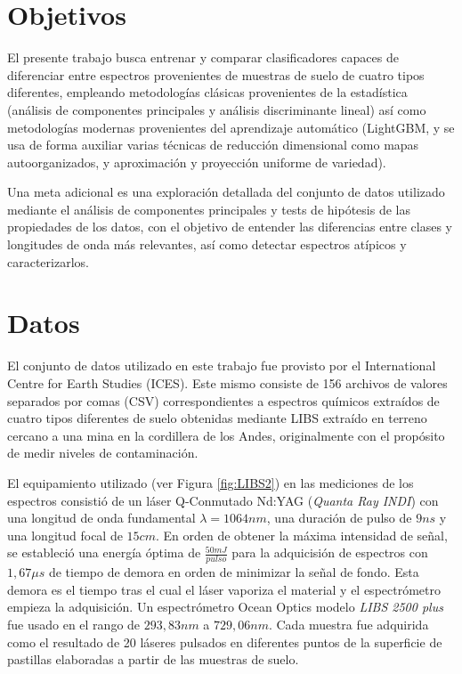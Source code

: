 \documentclass[12pt]{article}
\begin{document}
\section{Objetivos}

El presente trabajo busca entrenar y comparar clasificadores capaces de diferenciar entre espectros provenientes de muestras de suelo de cuatro tipos diferentes, empleando metodologías clásicas provenientes de la estadística (análisis de componentes principales y análisis discriminante lineal) así como metodologías modernas provenientes del aprendizaje automático (LightGBM, y se usa de forma auxiliar varias técnicas de reducción dimensional como mapas autoorganizados, y aproximación y proyección uniforme de variedad).

Una meta adicional es una exploración detallada del conjunto de datos utilizado mediante el análisis de componentes principales y tests de hipótesis de las propiedades de los datos, con el objetivo de entender las diferencias entre clases y longitudes de onda más relevantes, así como detectar espectros atípicos y caracterizarlos.

\section{Datos}

El conjunto de datos utilizado en este trabajo fue provisto por el International Centre for Earth Studies (ICES). Este mismo consiste de 156 archivos de valores separados por comas (CSV) correspondientes a espectros químicos extraídos de cuatro tipos diferentes de suelo obtenidas mediante LIBS extraído en terreno cercano a una mina en la cordillera de los Andes, originalmente con el propósito de medir niveles de contaminación. 

El equipamiento utilizado (ver Figura \ref{fig:LIBS2}) en las mediciones de los espectros consistió de un láser Q-Conmutado Nd:YAG (\textit{Quanta Ray INDI}) con una longitud de onda fundamental $\lambda = 1064nm$, una duración de pulso de $9ns$ y una longitud focal de $15cm$. En orden de obtener la máxima intensidad de señal, se estableció una energía óptima de $\frac{50mJ}{pulso}$ para la adquicisión de espectros con $1,67\mu s$ de tiempo de demora en orden de minimizar la señal de fondo. Esta demora es el tiempo tras el cual el láser vaporiza el material y el espectrómetro empieza la adquisición. Un espectrómetro Ocean Optics modelo \textit{LIBS 2500 plus} fue usado en el rango de $293,83nm$ a $729,06nm$. Cada muestra fue adquirida como el resultado de 20 láseres pulsados en diferentes puntos de la superficie de pastillas elaboradas a partir de las muestras de suelo.
\end{document}
